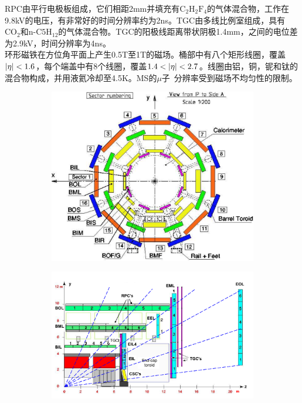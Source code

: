 RPC由平行电极板组成，它们相距2mm并填充有$\text{C}_{2}\text{H}_{2}\text{F}_{4}$的气体混合物，工作在9.8kV的电压，有非常好的时间分辨率约为2ns。TGC由多线比例室组成，具有$\text{CO}_{2}$和$\text{n-C5H}_{12}$的气体混合物。TGC的阳极线距离带状阴极1.4mm，之间的电位差为2.9kV，时间分辨率为4ns。\\
环形磁铁在方位角平面上产生0.5T至1T的磁场。桶部中有八个矩形线圈，覆盖$|\eta| <1.6$，每个端盖中有8个线圈，覆盖$1.4<\abseta<2.7$。线圈由铝，铜，铌和钛的混合物构成，并用液氦冷却至4.5K。MS的$\mu$子\pt~分辨率受到磁场不均匀性的限制。
\begin{figure}[h]
\begin{center}
 \begin{subfigure}[b]{0.45\textwidth}
      \includegraphics[width=\textwidth]{fig/Muon_sector_numbering.pdf}
      \caption{}
      \label{fig:muon_xy}
  \end{subfigure}
 \begin{subfigure}[b]{0.45\textwidth}
      \includegraphics[width=\textwidth]{fig/Muon_rz_large_sect_6.pdf}

\end{subfigure}
\end{center}
\end{figure}
